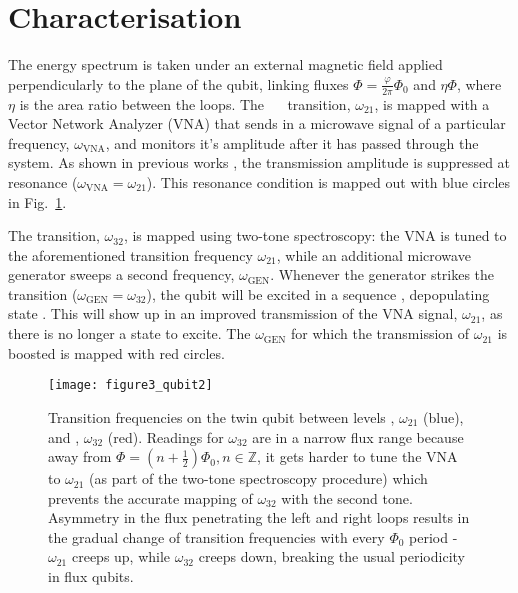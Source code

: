 \section{Characterisation}
\label{sec:characterisation}



\noindent The energy  spectrum is taken under an external  magnetic field applied
perpendicularly    to    the    plane    of    the    qubit,    linking    fluxes
$ \Phi  = \frac{\varphi}{2\pi}\Phi_0$ and $  \eta\Phi $, where  $ \eta $  is the area ratio  between the
loops. The ~\ilra~ transition, $\omega_{21}$,  is mapped with a Vector
Network  Analyzer  (VNA)  that  sends  in a  microwave  signal  of  a  particular
frequency,  $\omega_{\text{VNA}}$, and  monitors it's  amplitude after  it has  passed
through  the  system. As  shown  in  previous works  \cite{abdumalikov2010},  the
transmission       amplitude        is       suppressed        at       resonance
($\omega_{\text{VNA}}=\omega_{21}$).  This  resonance condition  is  mapped  out with  blue
circles in Fig.~\ref{fig:experiment}.

The  \ilra{}   transition,  $\omega_{32}$,  is  mapped   using  two-tone
spectroscopy:  the  VNA  is  tuned to  the  aforementioned  transition  frequency
$ \omega_{21}  $, while an additional  microwave generator sweeps a  second frequency,
$  \omega_{\text{GEN}}  $. Whenever  the  generator  strikes the  \ira{}
transition ($\omega_{\text{GEN}} = \omega_{32} $), the  qubit will be excited in a sequence
      ,  depopulating
state . This will show up in  an improved transmission of the VNA signal,
$\omega_{21}$,   as  there   is   no  longer   a  state      to  excite.   The
$\omega_{\text{GEN}}$ for which the transmission of $\omega_{21}$ is boosted is mapped with
red circles.


\begin{figure}[h]
  \texttt{[image: figure3\_qubit2]}
  \caption{\small  Transition  frequencies  on  the  twin  qubit  between  levels
    \ilra  {}, $  \omega_{21}  $ (blue),  and   \ilra  {},
    $ \omega_{32}$ (red).  Readings for $ \omega_{32}  $ are in a narrow flux range because
    away from $ \Phi = (n +  \frac{1}{2})\Phi_0, n\in\mathbb{Z} $, it gets harder to tune
    the VNA to $ \omega_{21} $ (as  part of the two-tone spectroscopy procedure) which
    prevents the accurate mapping of $  \omega_{32} $ with the second tone.  Asymmetry
    in  the flux  penetrating the  left and  right loops  results in  the gradual
    change   of  transition   frequencies  with   every  $   \Phi_{0}  $   period  -
    $\omega_{21}$  creeps  up,   while  $\omega_{32}$  creeps  down,   breaking  the  usual
    periodicity in flux qubits.}
  \label{fig:experiment}
\end{figure}

